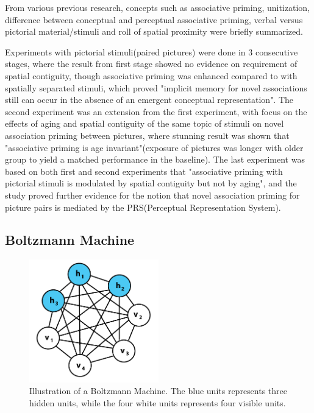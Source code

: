 \documentclass[12pt, a4paper]{article}
\begin{document}
From various previous research, concepts such as associative priming, unitization, difference between conceptual and perceptual associative priming, verbal versus pictorial material/stimuli and roll of spatial proximity were briefly summarized.


Experiments with pictorial stimuli(paired pictures) were done in 3 consecutive stages, where the result from first stage showed no evidence on requirement of spatial contiguity, though associative priming was enhanced compared to with spatially separated stimuli, which proved "implicit memory for novel associations still can occur in the absence of an emergent conceptual representation". The second experiment was an extension from the first experiment, with focus on the effects of aging and spatial contiguity of the same topic of stimuli on novel association priming between pictures, where stunning result was shown that "associative priming is age invariant"(exposure of pictures was longer with older group to yield a matched performance in the baseline). The last experiment was based on both first and second experiments that "associative priming with pictorial stimuli is modulated by spatial contiguity but not by aging", and the study proved further evidence for the notion that novel association priming for picture pairs is mediated by the PRS(Perceptual Representation System).

\subsection{Boltzmann Machine}


\begin{figure}[htbp]
	\begin{center}
		\includegraphics[width=0.5\textwidth]{inc/boltzmann_machine.png}
		\caption{Illustration of a Boltzmann Machine. The blue units represents three hidden units, while the four white units represents four visible units.\protect\footnotemark}
		\label{fig:boltzmann_machine}
	\end{center}
\end{figure}
\end{document}
